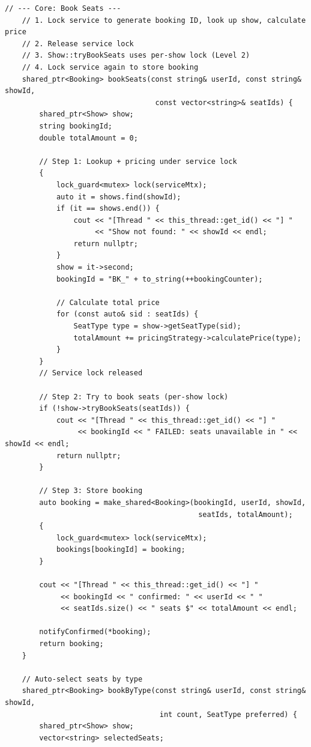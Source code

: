 \documentclass[11pt,a4paper]{article}
\begin{document}
\begin{lstlisting}[title={\texttt{managers.hpp}}]
    // --- Core: Book Seats ---
    // 1. Lock service to generate booking ID, look up show, calculate price
    // 2. Release service lock
    // 3. Show::tryBookSeats uses per-show lock (Level 2)
    // 4. Lock service again to store booking
    shared_ptr<Booking> bookSeats(const string& userId, const string& showId,
                                   const vector<string>& seatIds) {
        shared_ptr<Show> show;
        string bookingId;
        double totalAmount = 0;

        // Step 1: Lookup + pricing under service lock
        {
            lock_guard<mutex> lock(serviceMtx);
            auto it = shows.find(showId);
            if (it == shows.end()) {
                cout << "[Thread " << this_thread::get_id() << "] "
                     << "Show not found: " << showId << endl;
                return nullptr;
            }
            show = it->second;
            bookingId = "BK_" + to_string(++bookingCounter);

            // Calculate total price
            for (const auto& sid : seatIds) {
                SeatType type = show->getSeatType(sid);
                totalAmount += pricingStrategy->calculatePrice(type);
            }
        }
        // Service lock released

        // Step 2: Try to book seats (per-show lock)
        if (!show->tryBookSeats(seatIds)) {
            cout << "[Thread " << this_thread::get_id() << "] "
                 << bookingId << " FAILED: seats unavailable in " << showId << endl;
            return nullptr;
        }

        // Step 3: Store booking
        auto booking = make_shared<Booking>(bookingId, userId, showId,
                                             seatIds, totalAmount);
        {
            lock_guard<mutex> lock(serviceMtx);
            bookings[bookingId] = booking;
        }

        cout << "[Thread " << this_thread::get_id() << "] "
             << bookingId << " confirmed: " << userId << " "
             << seatIds.size() << " seats $" << totalAmount << endl;

        notifyConfirmed(*booking);
        return booking;
    }

    // Auto-select seats by type
    shared_ptr<Booking> bookByType(const string& userId, const string& showId,
                                    int count, SeatType preferred) {
        shared_ptr<Show> show;
        vector<string> selectedSeats;


\end{lstlisting}
\end{document}
